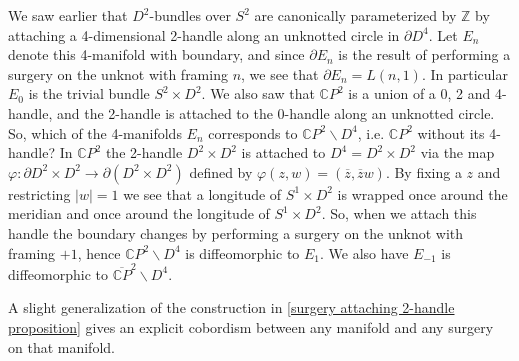 \begin{example}
\label{E_n spaces}
We saw earlier that $D^2$-bundles over $S^2$ are canonically parameterized by $\mathbb Z$ by attaching a 4-dimensional 2-handle along an unknotted circle in $\partial D^4$. Let $E_n$ denote this 4-manifold with boundary, and since $\partial E_n$ is the result of performing a surgery on the unknot with framing $n$, we see that $\partial E_n = L(n,1)$. In particular $E_0$ is the trivial bundle $S^2 \times D^2$. We also saw that $\mathbb CP^2$ is a union of a 0, 2 and 4-handle, and the 2-handle is attached to the 0-handle along an unknotted circle. So, which of the 4-manifolds $E_n$ corresponds to $\mathbb CP^2 \backslash D^4$, i.e. $\mathbb CP^2$ without its 4-handle? In $\mathbb CP^2$ the 2-handle $D^2 \times D^2$ is attached to $D^4 = D^2 \times D^2$ via the map $\varphi : \partial D^2 \times D^2 \rightarrow \partial (D^2 \times D^2)$ defined by $\varphi(z,w) = (\overline z, \overline zw)$. By fixing a $z$ and restricting $|w|=1$ we see that a longitude of $S^1 \times D^2$ is wrapped once around the meridian and once around the longitude of $S^1 \times D^2$. So, when we attach this handle the boundary changes by performing a surgery on the unknot with framing $+1$, hence $\mathbb CP^2 \backslash D^4$ is diffeomorphic to $E_1$. We also have $E_{-1}$ is diffeomorphic to $\overline{\mathbb CP}^2 \backslash D^4$. 
\end{example}

A slight generalization of the construction in \cref{surgery attaching 2-handle proposition} gives an explicit cobordism between any manifold and any surgery on that manifold.

